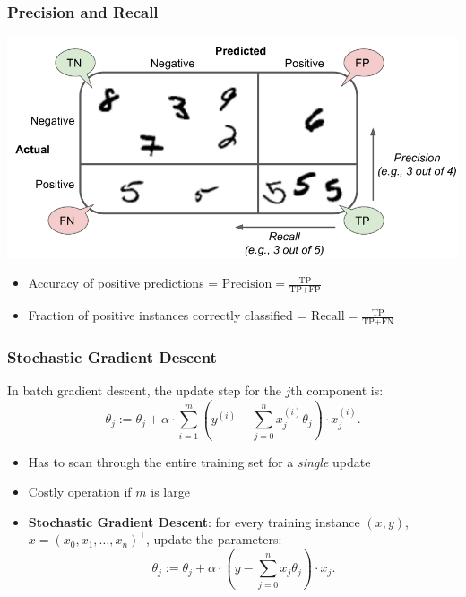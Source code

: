 \documentclass[xcolor=table]{beamer}
\newcommand{\trans}[1]{\ensuremath{#1}^{\scriptscriptstyle{\textsf{T}}}}
\newcommand{\TP}{\ensuremath{\text{TP}}}
\newcommand{\FP}{\ensuremath{\text{FP}}}
\newcommand{\FN}{\ensuremath{\text{FN}}}
\begin{document}
\begin{frame}[t]
\frametitle{Precision and Recall}
\begin{center}
	\includegraphics[scale=0.2]{precision_recall.png}
\end{center}
\begin{itemize}
	\item Accuracy of positive predictions = $\text{Precision} = \frac{\TP}{\TP + \FP}$
	\item Fraction of positive instances correctly classified = $\text{Recall} = \frac{\TP}{\TP + \FN}$  
\end{itemize}
\end{frame}

\begin{frame}[t]
\frametitle{Stochastic Gradient Descent}
In batch gradient descent, the update step for the $j$th component is:
\[
    \theta_j := \theta_j  + \alpha \cdot \sum_{i = 1}^m 
        \left ( y^{(i)} - \sum_{j = 0}^n x_j^{(i)} \theta_j \right ) \cdot x_j^{(i)}.
\]

\begin{itemize}
    \item Has to scan through the entire training set for a \emph{single} update
    
    \item Costly operation if $m$ is large
    
    \pause

    \item \textbf{Stochastic Gradient Descent}: for every training instance $(x, y)$, 
    $x = \trans{(x_0, x_1, \ldots, x_n)}$, update the parameters:
    \[
         \theta_j := \theta_j  + \alpha \cdot \left ( y - \sum_{j = 0}^n x_j 
         \theta_j \right ) \cdot x_j.
    \]
\end{itemize}
\end{frame}
\end{document}
